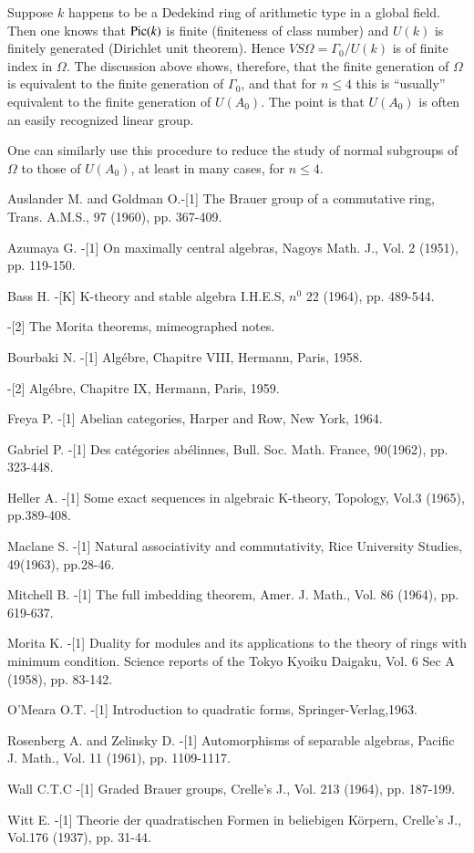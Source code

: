Suppose $k$ happens to be a Dedekind ring of arithmetic type in a
global field. Then one knows that $\operatorname{Pic} (k)$ is finite (finiteness of
class number) and $U(k)$ is finitely generated (Dirichlet unit
theorem). Hence $VS\Omega = \Gamma_0 / U(k)$ is of finite index in
$\Omega$. The discussion above shows, therefore, that the finite
generation of $\Omega$ is equivalent to the finite generation of
$\Gamma_0$, and that for $n \leq 4$ this is ``usually'' equivalent to
the finite generation of $U(A_0)$. The point is that $U(A_0)$ is often
an easily recognized linear group. 

One can similarly use this procedure to reduce the study of normal
subgroups of $\Omega$ to those of $U(A_0)$, at least in many cases, for
$n\leq 4$. 

\begin{thebibliography}{99}
 {Auslander M. and Goldman O.}\pageoriginale -[1] The Brauer
  group of a  
  commutative ring, Trans. A.M.S., 97 (1960), pp. 367-409.

 {Azumaya G.} -[1] On maximally central algebras, Nagoys
  Math. J., Vol. 2 (1951), pp. 119-150. 

 {Bass H.} -[K] K-theory and stable algebra I.H.E.S, $n^0$
  22 (1964), pp. 489-544. 

-[2] The Morita theorems, mimeographed notes.

 {Bourbaki N.} -[1] Alg\'ebre, Chapitre VIII, Hermann,
  Paris,   1958. 

-[2] Alg\'ebre, Chapitre IX, Hermann, Paris, 1959. 

 {Freya P.} -[1] Abelian categories, Harper and Row, New
  York, 1964. 

 {Gabriel P.} -[1] Des cat\'egories ab\'elinnes,
  Bull. Soc. Math. France, 90(1962), pp. 323-448. 

 {Heller A}. -[1] Some exact sequences in algebraic
  K-theory, Topology, Vol.3 (1965), pp.389-408. 

 {Maclane S.} -[1] Natural associativity and commutativity,
  Rice University Studies, 49(1963), pp.28-46. 

 {Mitchell B.} -[1] The full imbedding theorem,
  Amer. J. Math., Vol. 86 (1964), pp. 619-637. 

 {Morita K.} -[1] Duality for modules and its applications to
  the theory of rings with minimum condition. Science reports of the
  Tokyo Kyoiku Daigaku, Vol. 6 Sec A (1958), pp. 83-142. 

 {O'Meara O.T.} -[1] Introduction to quadratic forms,
  Springer-Verlag,1963. 

 {Rosenberg A. and Zelinsky D.} -[1] Automorphisms of
  separable algebras, Pacific J. Math., Vol. 11 (1961), pp. 1109-1117. 

 {Wall C.T.C} -[1] Graded Brauer groups, Crelle's J.,
  Vol. 213 (1964), pp. 187-199. 

 {Witt E.} -[1] Theorie der quadratischen Formen in
  beliebigen K\"orpern, Crelle's J., Vol.176 (1937), pp. 31-44. 
 \end{thebibliography} 

